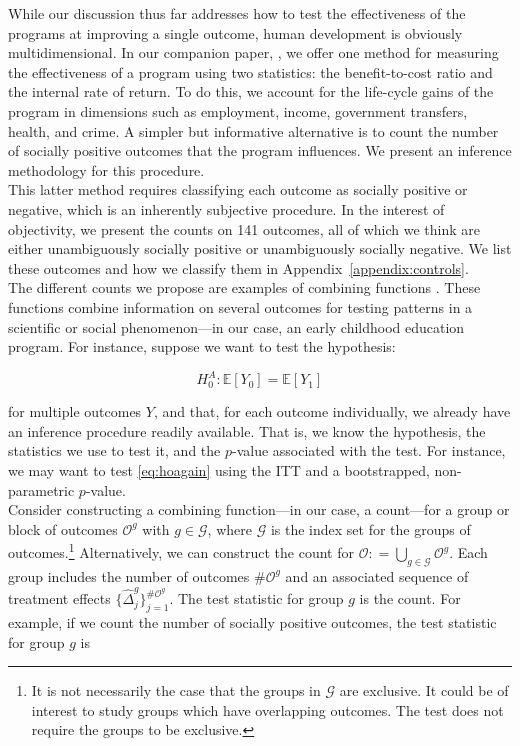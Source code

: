 \noindent While our discussion thus far addresses how to test the effectiveness of the programs at improving a single outcome, human development is obviously multidimensional. In our companion paper, \citet{Elango_et_al_2015_ABC_unpublished}, we offer one method for measuring the effectiveness of a program using two statistics: the benefit-to-cost ratio and the internal rate of return. To do this, we account for the life-cycle gains of the program in dimensions such as employment, income, government transfers, health, and crime. A simpler but informative alternative is to count the number of socially positive outcomes that the program influences. We present an inference methodology for this procedure.\\

\noindent This latter method requires classifying each outcome as socially positive or negative, which is an inherently subjective procedure. In the interest of objectivity, we present the counts on 141 outcomes, all of which we think are either unambiguously socially positive or unambiguously socially negative. We list these outcomes and how we classify them in Appendix~\ref{appendix:controls}.\\

\noindent The different counts we propose are examples of combining functions \citep[see][]{Pesarin_Salmaso_2010_PermutationTests}. These functions combine information on several outcomes for testing patterns in a scientific or social phenomenon---in our case, an early childhood education program. For instance, suppose we want to test the hypothesis: 

\begin{equation}
H_{0}^A: \mathbb{E} \left[ Y_{0} \right] =  \mathbb{E} \left[ Y_{1} \right] \label{eq:hoagain}
\end{equation}

\noindent for multiple outcomes $Y$, and that, for each outcome individually, we already have an inference procedure readily available. That is, we know the hypothesis, the statistics we use to test it, and the $p$-value associated with the test. For instance, we may want to test \eqref{eq:hoagain} using the ITT and a bootstrapped, non-parametric $p$-value.\\

\noindent Consider constructing a combining function---in our case, a count---for a group or block of outcomes $\mathcal{O}^g$ with $g \in \mathcal{G}$, where $\mathcal{G}$ is the index set for the groups of outcomes.\footnote{It is not necessarily the case that the groups in $\mathcal{G}$ are exclusive. It could be of interest to study groups which have overlapping outcomes. The test does not require the groups to be exclusive.} Alternatively, we can construct the count for $\mathcal{O} : =  \bigcup \limits _{g \in \mathcal{G}} \mathcal{O}^g$. Each group includes the number of outcomes $\# \mathcal{O}^g$ and an associated sequence of treatment effects $\{ \widehat{\Delta}_{j}^{g} \}_{j = 1}^{\# \mathcal{O}^g}$. The test statistic for group $g$ is the count. For example, if we count the number of socially positive outcomes, the test statistic for group $g$ is 

